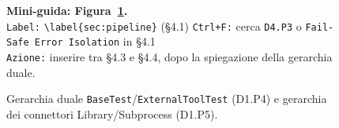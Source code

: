 \begin{figure}[ht]
{
  }%
  \caption{Gerarchia duale \texttt{BaseTest}/\texttt{ExternalToolTest} (D1.P4) e gerarchia dei connettori Library/Subprocess (D1.P5).}
  \label{fig:class-hierarchy}
  \par\smallskip
  {\small \noindent\textbf{Mini-guida: Figura~\ref{fig:class-hierarchy}.}\\
    \texttt{Label:} \verb|\label{sec:pipeline}| (\S4.1) \quad
    \texttt{Ctrl+F:} cerca \texttt{D4.P3} o \texttt{Fail-Safe Error Isolation} in \S4.1\\
    \texttt{Azione:} inserire tra \S4.3 e \S4.4, dopo la spiegazione della gerarchia duale. }
\end{figure}

